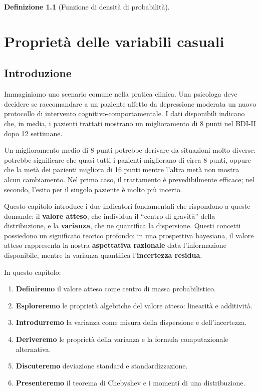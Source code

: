 \documentclass[
  italian,
  letterpaper,
  a4paper,
  11pt,
  open=any]{scrbook}
\providecommand{\tightlist}{%
  \setlength{\itemsep}{0pt}\setlength{\parskip}{0pt}}
\theoremstyle{plain}
\theoremstyle{definition}
\theoremstyle{definition}
\newtheorem{definition}{Definizione}[chapter]
\theoremstyle{remark}
\begin{document}
\begin{definition}[Funzione di densità di
probabilità]
\chapter{Proprietà delle variabili
casuali}\label{sec-prob-random-var-properties}

\section*{Introduzione}\label{introduzione-7}


Immaginiamo uno scenario comune nella pratica clinica. Una psicologa
deve decidere se raccomandare a un paziente affetto da depressione
moderata un nuovo protocollo di intervento cognitivo-comportamentale. I
dati disponibili indicano che, in media, i pazienti trattati mostrano un
miglioramento di 8 punti nel BDI-II dopo 12 settimane.

Un miglioramento medio di 8 punti potrebbe derivare da situazioni molto
diverse: potrebbe significare che quasi tutti i pazienti migliorano di
circa 8 punti, oppure che la metà dei pazienti migliora di 16 punti
mentre l'altra metà non mostra alcun cambiamento. Nel primo caso, il
trattamento è prevedibilmente efficace; nel secondo, l'esito per il
singolo paziente è molto più incerto.

Questo capitolo introduce i due indicatori fondamentali che rispondono a
queste domande: il \textbf{valore atteso}, che individua il ``centro di
gravità'' della distribuzione, e la \textbf{varianza}, che ne quantifica
la dispersione. Questi concetti possiedono un significato teorico
profondo: in una prospettiva bayesiana, il valore atteso rappresenta la
nostra \textbf{aspettativa razionale} data l'informazione disponibile,
mentre la varianza quantifica l'\textbf{incertezza residua}.

In questo capitolo:

\begin{enumerate}
\def\labelenumi{\arabic{enumi}.}
\tightlist
\item
  \textbf{Definiremo} il valore atteso come centro di massa
  probabilistico.
\item
  \textbf{Esploreremo} le proprietà algebriche del valore atteso:
  linearità e additività.
\item
  \textbf{Introdurremo} la varianza come misura della dispersione e
  dell'incertezza.
\item
  \textbf{Deriveremo} le proprietà della varianza e la formula
  computazionale alternativa.
\item
  \textbf{Discuteremo} deviazione standard e standardizzazione.
\item
  \textbf{Presenteremo} il teorema di Chebyshev e i momenti di una
  distribuzione.
\end{enumerate}


\end{definition}
\end{document}
